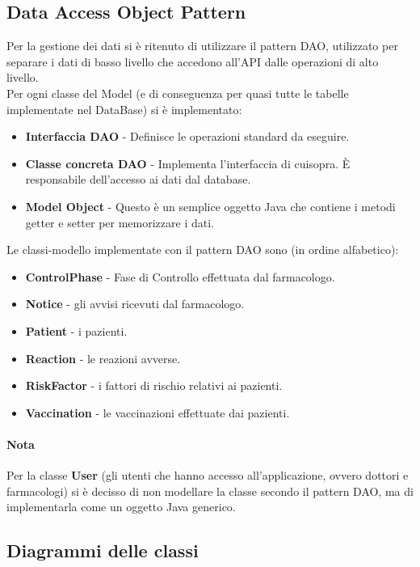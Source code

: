 \documentclass{article}
\begin{document}
\subsection{Data Access Object Pattern}
    Per la gestione dei dati si è ritenuto di utilizzare il pattern DAO, utilizzato per separare i dati di basso livello che accedono all'API dalle operazioni di alto livello.\\
    Per ogni classe del Model (e di conseguenza per quasi tutte le tabelle implementate nel DataBase) si è implementato:
        \begin{itemize}
            \item \textbf{Interfaccia DAO} - Definisce le operazioni standard da eseguire.
            \item \textbf{Classe concreta DAO} - Implementa l'interfaccia di cuisopra. È responsabile dell'accesso ai dati dal database.
            \item \textbf{Model Object} - Questo è un semplice oggetto Java che contiene i metodi getter e setter per memorizzare i dati.
        \end{itemize}
    Le classi-modello implementate con il pattern DAO sono (in ordine alfabetico):
        \begin{itemize}
            \item \textbf{ControlPhase} - Fase di Controllo effettuata dal farmacologo.
            \item \textbf{Notice} - gli avvisi ricevuti dal farmacologo.
            \item \textbf{Patient} - i pazienti.
            \item \textbf{Reaction} - le reazioni avverse.
            \item \textbf{RiskFactor} - i fattori di rischio relativi ai pazienti.
            \item \textbf{Vaccination} - le vaccinazioni effettuate dai pazienti.
        \end{itemize}

    \paragraph*{Nota}
    Per la classe \textbf{User} (gli utenti che hanno accesso all'applicazione, ovvero dottori e farmacologi) si è decisso di non modellare la classe secondo il pattern DAO, ma di implementarla come un oggetto Java generico.

\newpage
    \subsection{Diagrammi delle classi}
\end{document}
